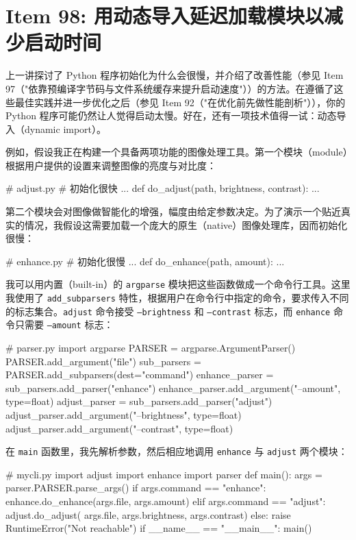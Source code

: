 \section{Item 98: 用动态导入延迟加载模块以减少启动时间}

上一讲探讨了 Python 程序初始化为什么会很慢，并介绍了改善性能（参见 Item 97（"依靠预编译字节码与文件系统缓存来提升启动速度"））的方法。在遵循了这些最佳实践并进一步优化之后（参见 Item 92（"在优化前先做性能剖析"）），你的 Python 程序可能仍然让人觉得启动太慢。好在，还有一项技术值得一试：动态导入（dynamic import）。

例如，假设我正在构建一个具备两项功能的图像处理工具。第一个模块（module）根据用户提供的设置来调整图像的亮度与对比度：

\begin{codebox}[python]
# adjust.py
# 初始化很快
...
def do_adjust(path, brightness, contrast):
    ...
\end{codebox}

第二个模块会对图像做智能化的增强，幅度由给定参数决定。为了演示一个贴近真实的情况，我假设这需要加载一个庞大的原生（native）图像处理库，因而初始化很慢：

\begin{codebox}[python]
# enhance.py
# 初始化很慢
...
def do_enhance(path, amount):
    ...
\end{codebox}

我可以用内置（built-in）的 \texttt{argparse} 模块把这些函数做成一个命令行工具。这里我使用了 \texttt{add\_subparsers} 特性，根据用户在命令行中指定的命令，要求传入不同的标志集合。\texttt{adjust} 命令接受 \texttt{--brightness} 和 \texttt{--contrast} 标志，而 \texttt{enhance} 命令只需要 \texttt{--amount} 标志：

\begin{codebox}[python]
# parser.py
import argparse
PARSER = argparse.ArgumentParser()
PARSER.add_argument("file")
sub_parsers = PARSER.add_subparsers(dest="command")
enhance_parser = sub_parsers.add_parser("enhance")
enhance_parser.add_argument("--amount", type=float)
adjust_parser = sub_parsers.add_parser("adjust")
adjust_parser.add_argument("--brightness", type=float)
adjust_parser.add_argument("--contrast", type=float)
\end{codebox}

在 \texttt{main} 函数里，我先解析参数，然后相应地调用 \texttt{enhance} 与 \texttt{adjust} 两个模块：

\begin{codebox}[python]
# mycli.py
import adjust
import enhance
import parser
def main():
    args = parser.PARSER.parse_args()
    if args.command == "enhance":
        enhance.do_enhance(args.file, args.amount)
    elif args.command == "adjust":
         adjust.do_adjust(
    args.file, args.brightness, args.contrast)
    else:
        raise RuntimeError("Not reachable")
if __name__ == "__main__":
    main()
\end{codebox}

